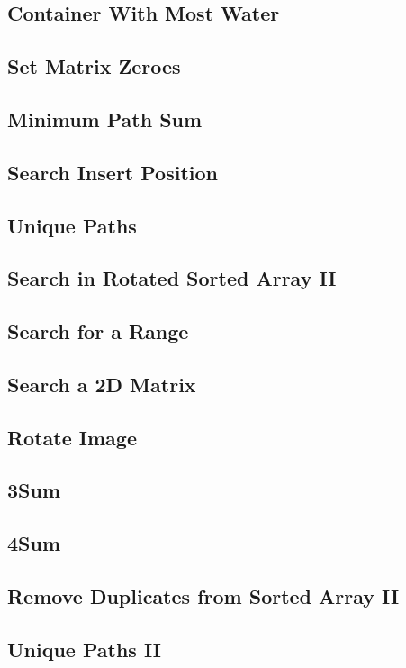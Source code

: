 \documentclass[12pt]{book}
\begin{document}
\subsection{Container With Most Water}
\label{sec-1-2-3}
\subsection{Set Matrix Zeroes}
\label{sec-1-2-4}
\subsection{Minimum Path Sum}
\label{sec-1-2-5}
\subsection{Search Insert Position}
\label{sec-1-2-6}
\subsection{Unique Paths}
\label{sec-1-2-7}
\subsection{Search in Rotated Sorted Array II}
\label{sec-1-2-8}
\subsection{Search for a Range}
\label{sec-1-2-9}
\subsection{Search a 2D Matrix}
\label{sec-1-2-10}
\subsection{Rotate Image}
\label{sec-1-2-11}
\subsection{3Sum}
\label{sec-1-2-12}
\subsection{4Sum}
\label{sec-1-2-13}
\subsection{Remove Duplicates from Sorted Array II}
\label{sec-1-2-14}
\subsection{Unique Paths II}
\label{sec-1-2-15}
\end{document}
